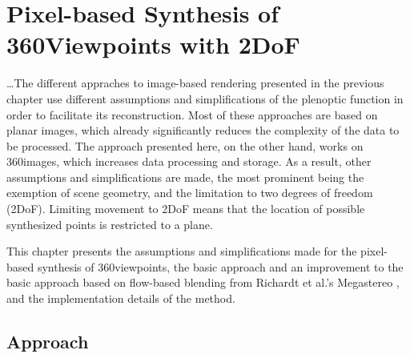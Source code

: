 \chapter{Pixel-based Synthesis of 360\degree Viewpoints with 2DoF}\label{chap:implementation}

\ldots The different appraches to image-based rendering presented in the previous chapter use different assumptions and simplifications of the plenoptic function in order to facilitate its reconstruction. Most of these approaches are based on planar images, which already significantly reduces the complexity of the data to be processed. The approach presented here, on the other hand, works on 360\degree images, which increases data processing and storage. As a result, other assumptions and simplifications are made, the most prominent being the exemption of scene geometry, and the limitation to two degrees of freedom (2DoF). Limiting movement to 2DoF means that the location of possible synthesized points is restricted to a plane. 

This chapter presents the assumptions and simplifications made for the pixel-based synthesis of 360\degree viewpoints, the basic approach and an improvement to the basic approach based on flow-based blending from Richardt et al.'s Megastereo \cite{megastereo}, and the implementation details of the method.

\section{Approach} \label{sec:approach}


